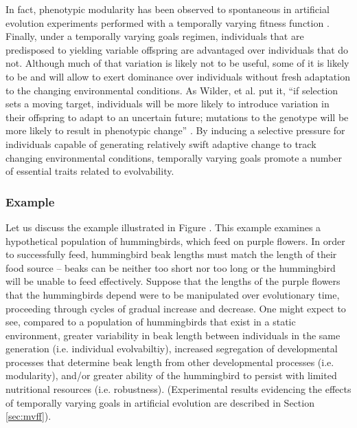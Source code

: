 In fact, phenotypic modularity has been observed to spontaneous in artificial evolution experiments performed with a temporally varying fitness function \cite{Kashtan2007VaryingEvolution}. Finally, under a temporally varying goals regimen, individuals that are predisposed to yielding variable offspring are advantaged over individuals that do not.\mindmapmark{\individualevolvabilitytemporallyvaryinggoals} Although much of that variation is likely not to be useful, some of it is likely to be and will allow to exert dominance over individuals without fresh adaptation to the changing environmental conditions. As Wilder, et al. put it, ``if selection sets a moving target, individuals will be more likely to introduce variation in their offspring to adapt to an uncertain future; mutations to the genotype will be more likely to result in phenotypic change'' \cite{Wilder2015ReconcilingEvolvability}. By inducing a selective pressure for individuals capable of generating relatively swift adaptive change to track changing environmental conditions, temporally varying goals promote a number of essential traits related to evolvability.

\subsubsection{Example}

Let us discuss the example illustrated in Figure   . This example examines a hypothetical population  of hummingbirds, which feed on purple flowers. In order to successfully feed, hummingbird beak lengths must match the length of their food source -- beaks can be neither too short nor too long or the hummingbird will be unable to feed effectively. Suppose that the lengths of the purple flowers that the hummingbirds depend were to be manipulated over evolutionary time, proceeding through cycles of gradual increase and decrease. One might expect to see, compared to a population of hummingbirds that exist in a static environment, greater variability in beak length between individuals in the same generation (i.e. individual evolvabiltiy), increased segregation of developmental processes that determine beak length from other developmental processes (i.e. modularity), and/or greater ability of the hummingbird to persist with limited nutritional resources (i.e. robustness). (Experimental results evidencing the effects of temporally varying goals in artificial evolution are described in Section \ref{sec:mvff}).


